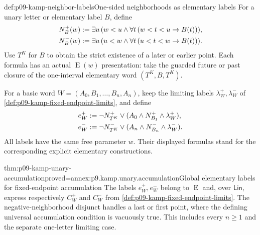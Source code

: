 \begin{hbdefinition}{def:p09-kamp-neighbor-labels}{One-sided neighborhoods as elementary labels}
For a unary letter or elementary label \(B\), define
\[
\begin{aligned}
 N_B^+(w)&\mathrel{:=}\exists u\,(w<u\land\forall t\,(w<t<u\to B(t))),\\
 N_B^-(w)&\mathrel{:=}\exists u\,(u<w\land\forall t\,(u<t<w\to B(t))).
\end{aligned}
\]
Use \(T^K\) for \(B\) to obtain the strict existence of a
later or earlier point. Each formula has an actual
\(\operatorname{E}(w)\) presentation: take the guarded future
or past closure of the one-interval elementary word \((T^K,B,T^K)\).

For a basic word \(W=(A_0,B_1,\ldots,B_n,A_n)\), keep the
limiting labels \(\lambda_W^+,\lambda_W^-\) of
\cref{def:p09-kamp-fixed-endpoint-limits}, and define
\[
\begin{aligned}
 e_W^+&\mathrel{:=}\neg N_{T^K}^+\lor
                  (A_0\land N_{B_1}^+\land\lambda_W^+),\\
 e_W^-&\mathrel{:=}\neg N_{T^K}^-\lor
                  (A_n\land N_{B_n}^-\land\lambda_W^-).
\end{aligned}
\]
All labels have the same free parameter \(w\). Their displayed
formulas stand for the corresponding explicit elementary constructions.
\end{hbdefinition}

\begin{hblemma}{thm:p09-kamp-unary-accumulation}{proved=annex:p9.kamp.unary.accumulation}{Global elementary labels for fixed-endpoint accumulation}
The labels \(e_W^+,e_W^-\) belong to \(\operatorname{E}\)
and, over \(\mathsf{Lin}\), express respectively
\(C_W^+\) and \(C_W^-\) from
\cref{def:p09-kamp-fixed-endpoint-limits}. The negative-neighborhood
disjunct handles a last or first point, where the defining universal
accumulation condition is vacuously true. This includes every
\(n\geq1\) and the separate one-letter limiting case.
\end{hblemma}

